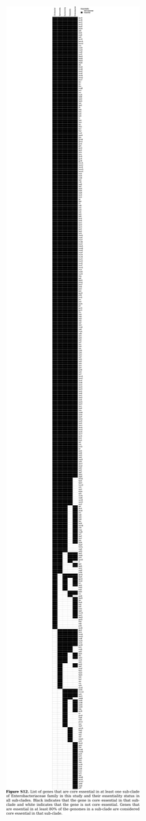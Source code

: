 \documentclass{article}
\begin{document}
\begin{preview}
\includegraphics{suppl12.pdf}
\end{preview}
\end{document}
